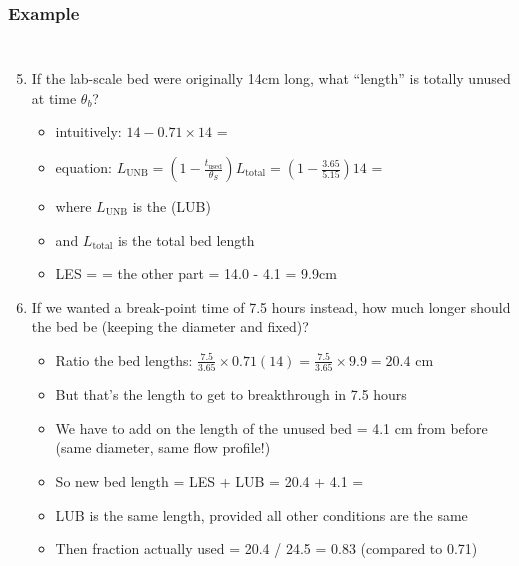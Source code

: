 \begin{frame}\frametitle{Example}
	\vspace{-12pt}
	\begin{columns}[t]
		\begin{enumerate}
			\setcounter{enumi}{4}
			\item	If the lab-scale bed were originally 14cm long, what ``length'' is totally unused at time $\theta_b$?
				\begin{itemize}
					\item	intuitively: $14 - 0.71 \times 14$ = {\color{myOrange}{4.1 cm}}
					\item	equation: $L_\text{UNB} = \left(1 - \displaystyle\frac{t_\text{used}}{\theta_S} \right)L_\text{total} = \left(1 - \displaystyle\frac{3.65}{5.15} \right)14$ = {\color{myOrange}{4.1 cm}}
					\item	where $L_\text{UNB}$ is the {\color{purple}{length of the unused bed}} (LUB)
					\item	and $L_\text{total}$ is the total bed length
					\item	LES = {\color{purple}{length of equilibrium section}} = the other part = 14.0 - 4.1 = 9.9cm					
				\end{itemize}
			\vspace{6pt}
			\pause
			\item	If we wanted a break-point time of 7.5 hours instead, how much longer should the bed be {\small (keeping the diameter and {\color{purple}{flow profile}} fixed)}?
			\begin{itemize}
				\item	Ratio the bed lengths: $\displaystyle \frac{7.5}{3.65} \times 0.71(14) = \frac{7.5}{3.65} \times 9.9 = 20.4$ cm
				\item	But that's the length to get to breakthrough in 7.5 hours
				\item	We have to add on the length of the unused bed = 4.1 cm from before (same diameter, same flow profile!)
				\item	So new bed length = LES + LUB = 20.4 + 4.1  = {\color{myOrange}{24.5 cm}}
				\item	LUB is the same length, provided all other conditions are the same
				\item	Then fraction actually used = 20.4 / 24.5 = 0.83 {\scriptsize (compared to 0.71)}
			\end{itemize}
		\end{enumerate}
	\end{columns}	
\end{frame}

